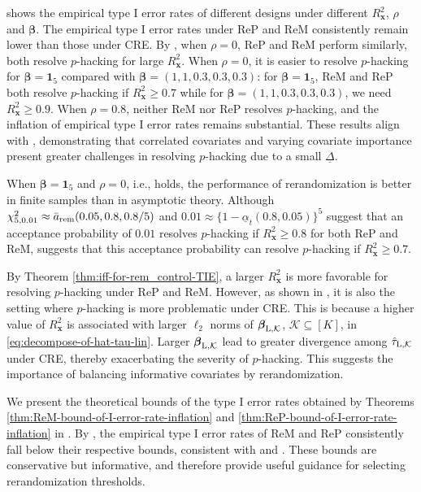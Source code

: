 \documentclass[12pt]{article}
\newcommand{\Lin}{\textnormal{L}}
\newcommand{\mk}{\mathcal{K}}
\newcommand{\rem}{\textnormal{rem}}
\newcommand{\bs}{\boldsymbol}
\begin{document}
 shows the empirical type I error rates of different designs under different $R_{\bs{x}}^2$, $\rho$ and $\bs{\beta}$. The empirical type I error rates under ReP and ReM consistently remain lower than those under CRE.  By , when $\rho = 0$, ReP and ReM perform similarly, both resolve $p$-hacking for large $R_{\bs{x}}^2$. When $\rho = 0$, it is easier to resolve $p$-hacking for $\bs{\beta} = \bs{1}_5$ compared with $\bs{\beta} = (1,1,0.3,0.3,0.3)$: for $\bs{\beta} = \bs{1}_5$, ReM and ReP both resolve $p$-hacking if $R_{\bs{x}}^2 \geq 0.7$ while for $\bs{\beta} = (1,1,0.3,0.3,0.3)$, we need $R_{\bs{x}}^2 \geq 0.9$. When $\rho = 0.8$, neither ReM nor ReP resolves $p$-hacking, and the inflation of empirical type I error rates remains substantial. These results align with , demonstrating that correlated covariates and varying covariate importance present greater challenges in resolving $p$-hacking due to a small $\underline{\Delta}$. 

When $\bs{\beta}=\bs{1}_5$ and $\rho = 0$, i.e.,  holds, the performance of rerandomization is better in finite samples than in asymptotic theory. Although $\chi^2_{5,0.01} \approx \bar{a}_{\rem}(0.05,0.8,0.8/5)$ and $0.01 \approx \{1-\underline{\alpha}_t(0.8,0.05)\}^5$ suggest that an acceptance probability of $0.01$ resolves $p$-hacking if $R_{\bs{x}}^2 \geq 0.8$ for both ReP and ReM,  suggests that this acceptance probability can resolve $p$-hacking if $R_{\bs{x}}^2 \geq 0.7$. 

 By Theorem \ref{thm:iff-for-rem_control-TIE}, a larger $R^2_{\bs{x}}$ is more favorable for resolving $p$-hacking under ReP and ReM. However, as shown in , it is also the setting where $p$-hacking is more problematic under CRE. This is because a higher value of $R^2_{\bs{x}}$ is associated with larger $\ell_2$ norms of $\bs{\beta}_{\Lin,\mk}$, $\mk \subseteq [K]$, in \eqref{eq:decompose-of-hat-tau-lin}. Larger $\bs{\beta}_{\Lin,\mk}$ lead to greater divergence among $\hat{\tau}_{\Lin,\mk}$ under CRE, thereby exacerbating the severity of $p$-hacking.  This suggests the importance of balancing informative covariates by rerandomization.

We present the theoretical bounds of the type I error rates obtained by Theorems \ref{thm:ReM-bound-of-I-error-rate-inflation} and \ref{thm:ReP-bound-of-I-error-rate-inflation} in . By , the empirical type I error rates of ReM and ReP consistently fall below their respective bounds, consistent with  and . These bounds are conservative but informative, and therefore provide useful guidance for selecting rerandomization thresholds.
\end{document}
